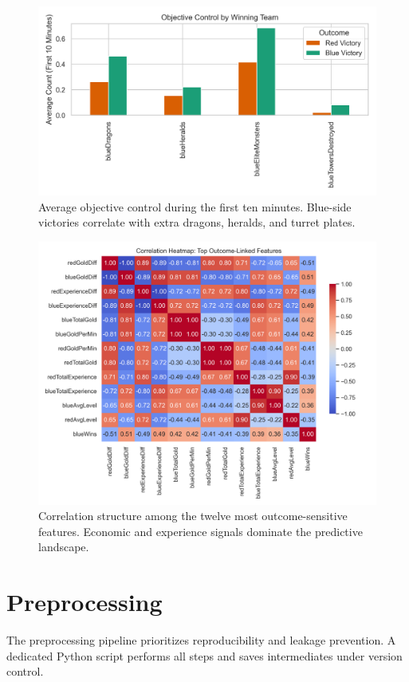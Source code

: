 \documentclass[aps,prl,preprint,groupedaddress]{revtex4-2}
\begin{document}
\begin{figure}[H]
    \centering
    \includegraphics[width=0.65\linewidth]{figures/eda/objective_control.png}
    \caption{Average objective control during the first ten minutes. Blue-side victories correlate with extra dragons, heralds, and turret plates.}
    \label{fig:objective}
\end{figure}

\begin{figure}[H]
    \centering
    \includegraphics[width=0.8\linewidth]{figures/eda/top_feature_correlation_heatmap.png}
    \caption{Correlation structure among the twelve most outcome-sensitive features. Economic and experience signals dominate the predictive landscape.}
    \label{fig:heatmap}
\end{figure}

\section{Preprocessing}
\label{sec:preprocessing}

The preprocessing pipeline prioritizes reproducibility and leakage prevention. A dedicated Python script performs all steps and saves intermediates under version control.
\end{document}
